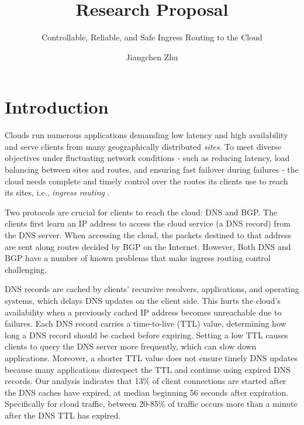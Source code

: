 \documentclass[sigconf,nonacm,screen,letterpaper,9pt]{acmart}
\title{Research Proposal}
\subtitle{Controllable, Reliable, and Safe Ingress Routing to the Cloud}
\author{Jiangchen Zhu}
\affiliation{\institution{Columbia University}}
\date{}
\begin{document}

\maketitle


\setlength{\footskip}{40pt}

\hypertarget{introduction}{%
\section{Introduction}\label{introduction}}

Clouds run numerous applications demanding low latency and high
availability and serve clients from many geographically distributed
\textit{sites}. To meet diverse objectives under fluctuating network
conditions - such as reducing latency, load balancing between sites and
routes, and ensuring fast failover during failures - the cloud needs
complete and timely control over the routes its clients use to reach its
sites, i.e., \textit{ingress routing} .

Two protocols are crucial for clients to reach the cloud: DNS and BGP.
The clients first learn an IP address to access the cloud service (a DNS
record) from the DNS server. When accessing the cloud, the packets
destined to that address are sent along routes decided by BGP on the
Internet. However, Both DNS and BGP have a number of known problems that
make ingress routing control challenging.

DNS records are cached by clients' recursive resolvers, applications,
and operating systems, which delays DNS updates on the client side. This
hurts the cloud's availability when a previously cached IP address
becomes unreachable due to failures. Each DNS record carries a
time-to-live (TTL) value, determining how long a DNS record should be
cached before expiring. Setting a low TTL causes clients to query the
DNS server more frequently, which can slow down applications. Moreover,
a shorter TTL value does not ensure timely DNS updates because many
applications disrespect the TTL and continue using expired DNS records.
Our analysis indicates that 13\% of client connections are started after
the DNS caches have expired, at median beginning 56 seconds after
expiration. Specifically for cloud traffic, between 20-85\% of traffic
occurs more than a minute after the DNS TTL has expired.
\end{document}
